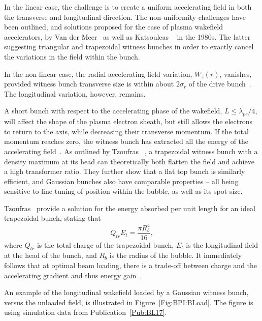 In the linear case, the challenge is to create a uniform accelerating field in both the transverse and longitudinal direction.
The non-uniformity challenges have been outlined, and solutions proposed for the case of plasma wakefield accelerators, by Van der Meer~\cite{van_der_meer:1985} as well as Katsouleas \etal~\cite{katsouleas:1987} in the 1980s.
The latter suggesting triangular and trapezoidal witness bunches in order to exactly cancel the variations in the field within the bunch.

In the non-linear case, the radial accelerating field variation, $W_{z}(r)$, vanishes, provided witness bunch transverse size is within about $2\sigma_{r}$ of the drive bunch~\cite{rosenzweig:1991}.
The longitudinal variation, however, remains.

A short bunch with respect to the accelerating phase of the wakefield, $L \leq \lambda_{pe}/4$, will affect the shape of the plasma electron sheath, but still allows the electrons to return to the axis, while decreasing their transverse momentum.
If the total momentum reaches zero, the witness bunch has extracted all the energy of the accelerating field~\cite{lu:2006a,lu:2006}.
As outlined by Tzoufras \etal~\cite{tzoufras:2009}, a trapezoidal witness bunch with a density maximum at its head can theoretically both flatten the field and achieve a high transformer ratio.
They further show that a flat top bunch is similarly efficient, and Gaussian bunches also have comparable properties -- all being sensitive to fine tuning of position within the bubble, as well as its spot size.

Tzoufras \etal ~provide a solution for the energy absorbed per unit length for an ideal trapezoidal bunch, stating that
\begin{equation}
    Q_{tr}E_{t} = \frac{\pi R_{b}^{4}}{16}, \label{EQ:Trapez}
\end{equation}
where $Q_{tr}$ is the total charge of the trapezoidal bunch, $E_{t}$ is the longitudinal field at the head of the bunch, and $R_{b}$ is the radius of the bubble.
It immediately follows that at optimal beam loading, there is a trade-off between charge and the accelerating gradient and thus energy gain~\cite{tzoufras:2009}.

An example of the longitudinal wakefield loaded by a Gaussian witness bunch, versus the unloaded field, is illustrated in Figure~\ref{Fig:BPI:BLoad}.
The figure is using simulation data from Publication~\ref{Pub:BL17}.

